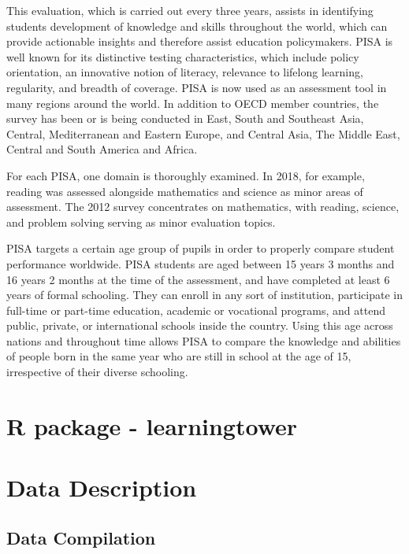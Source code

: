 This evaluation, which is carried out every three years, assists in
identifying students development of knowledge and skills throughout the
world, which can provide actionable insights and therefore assist
education policymakers. PISA is well known for its distinctive testing
characteristics, which include policy orientation, an innovative notion
of literacy, relevance to lifelong learning, regularity, and breadth of
coverage. PISA is now used as an assessment tool in many regions around
the world. In addition to OECD member countries, the survey has been or
is being conducted in East, South and Southeast Asia, Central,
Mediterranean and Eastern Europe, and Central Asia, The Middle East,
Central and South America and Africa.

For each PISA, one domain is thoroughly examined. In 2018, for example,
reading was assessed alongside mathematics and science as minor areas of
assessment. The 2012 survey concentrates on mathematics, with reading,
science, and problem solving serving as minor evaluation topics.

PISA targets a certain age group of pupils in order to properly compare
student performance worldwide. PISA students are aged between 15 years 3
months and 16 years 2 months at the time of the assessment, and have
completed at least 6 years of formal schooling. They can enroll in any
sort of institution, participate in full-time or part-time education,
academic or vocational programs, and attend public, private, or
international schools inside the country. Using this age across nations
and throughout time allows PISA to compare the knowledge and abilities
of people born in the same year who are still in school at the age of
15, irrespective of their diverse schooling.

\hypertarget{r-package---learningtower}{%
\section{R package - learningtower}\label{r-package---learningtower}}

\hypertarget{data-description}{%
\section{Data Description}\label{data-description}}

\hypertarget{data-compilation}{%
\subsection{Data Compilation}\label{data-compilation}}

